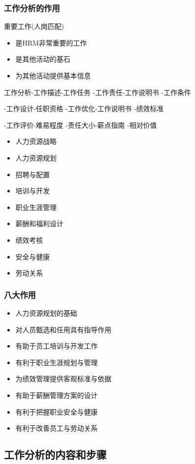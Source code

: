 \documentclass{ctexart}
\begin{document}
\subsubsection{工作分析的作用}
\label{sec-1-1-6}
重要工作(人岗匹配)
\begin{itemize}
\item 是HRM非常重要的工作
\item 是其他活动的基石
\item 为其他活动提供基本信息
\end{itemize}
工作分析-工作描述-工作任务
                -工作责任-工作说明书
                -工作条件

-工作设计-任职资格
         -工作优化-工作说明书
         -绩效标准

-工作评价-难易程度
         -责任大小-薪点指南
         -相对价值
\begin{itemize}
\item 人力资源战略
\item 人力资源规划
\item 招聘与配置
\item 培训与开发
\item 职业生涯管理
\item 薪酬和福利设计
\item 绩效考核
\item 安全与健康
\item 劳动关系
\end{itemize}
\subsubsection{八大作用}
\label{sec-1-1-7}
\begin{itemize}
\item 人力资源规划的基础
\item 对人员甄选和任用具有指导作用
\item 有助于员工培训与开发工作
\item 有利于职业生涯规划与管理
\item 为绩效管理提供客观标准与依据
\item 有助于薪酬管理方案的设计
\item 有利于把握职业安全与健康
\item 有利于改善员工与劳动关系
\end{itemize}
\subsection{工作分析的内容和步骤}
\label{sec-1-2}
\end{document}
